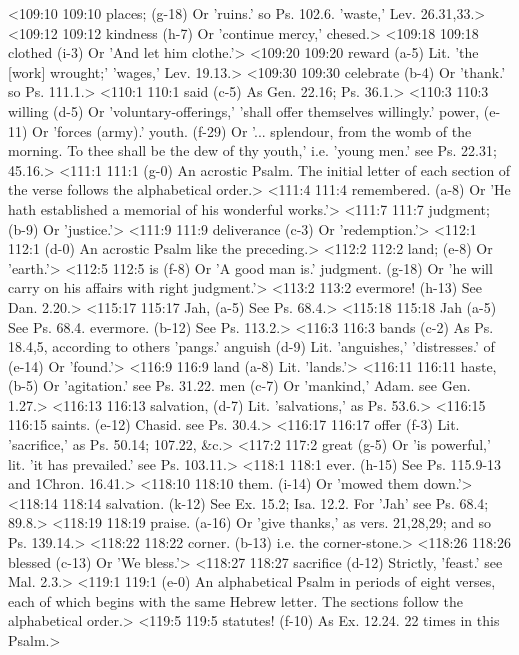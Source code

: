 <109:10 109:10  places; (g-18)  Or 'ruins.' so Ps. 102.6. 'waste,' Lev. 26.31,33.>
<109:12 109:12  kindness (h-7)  Or 'continue mercy,' chesed.>
<109:18 109:18  clothed (i-3)  Or 'And let him clothe.'>
<109:20 109:20  reward (a-5)  Lit. 'the [work] wrought;' 'wages,' Lev. 19.13.>
<109:30 109:30  celebrate (b-4)  Or 'thank.' so Ps. 111.1.>
<110:1 110:1  said (c-5)  As Gen. 22.16; Ps. 36.1.>
<110:3 110:3  willing (d-5)  Or 'voluntary-offerings,' 'shall offer themselves willingly.'
  power, (e-11)  Or 'forces (army).'
  youth. (f-29)  Or '... splendour, from the womb of the morning. To thee  shall be the dew of thy youth,' i.e. 'young men.' see Ps. 22.31; 45.16.>
<111:1 111:1   (g-0)  An acrostic Psalm. The initial letter of each section of the  verse follows the alphabetical order.>
<111:4 111:4  remembered. (a-8)  Or 'He hath established a memorial of his wonderful works.'>
<111:7 111:7  judgment; (b-9)  Or 'justice.'>
<111:9 111:9  deliverance (c-3)  Or 'redemption.'>
<112:1 112:1   (d-0)  An acrostic Psalm like the preceding.>
<112:2 112:2  land; (e-8)  Or 'earth.'>
<112:5 112:5  is (f-8)  Or 'A good man is.'
  judgment. (g-18)  Or 'he will carry on his affairs with right judgment.'>
<113:2 113:2  evermore! (h-13)  See Dan. 2.20.>
<115:17 115:17  Jah, (a-5)  See Ps. 68.4.>
<115:18 115:18  Jah (a-5)  See Ps. 68.4.
  evermore. (b-12)  See Ps. 113.2.>
<116:3 116:3  bands (c-2)  As Ps. 18.4,5, according to others 'pangs.'
  anguish (d-9)  Lit. 'anguishes,' 'distresses.'
  of (e-14)  Or 'found.'>
<116:9 116:9  land (a-8)  Lit. 'lands.'>
<116:11 116:11  haste, (b-5)  Or 'agitation.' see Ps. 31.22.
  men (c-7)  Or 'mankind,' Adam. see Gen. 1.27.>
<116:13 116:13  salvation, (d-7)  Lit. 'salvations,' as Ps. 53.6.>
<116:15 116:15  saints. (e-12)  Chasid. see Ps. 30.4.>
<116:17 116:17  offer (f-3)  Lit. 'sacrifice,' as Ps. 50.14; 107.22, &c.>
<117:2 117:2  great (g-5)  Or 'is powerful,' lit. 'it has prevailed.' see Ps. 103.11.>
<118:1 118:1  ever. (h-15)  See Ps. 115.9-13 and 1Chron. 16.41.>
<118:10 118:10  them. (i-14)  Or 'mowed them down.'>
<118:14 118:14  salvation. (k-12)  See Ex. 15.2; Isa. 12.2. For 'Jah' see Ps. 68.4; 89.8.>
<118:19 118:19  praise. (a-16)  Or 'give thanks,' as vers. 21,28,29; and so Ps. 139.14.>
<118:22 118:22  corner. (b-13)  i.e. the corner-stone.>
<118:26 118:26  blessed (c-13)  Or 'We bless.'>
<118:27 118:27  sacrifice (d-12)  Strictly, 'feast.' see Mal. 2.3.>
<119:1 119:1   (e-0)  An alphabetical Psalm in periods of eight verses, each of  which begins with the same Hebrew letter. The sections follow  the alphabetical order.>
<119:5 119:5  statutes! (f-10)  As Ex. 12.24. 22 times in this Psalm.>
